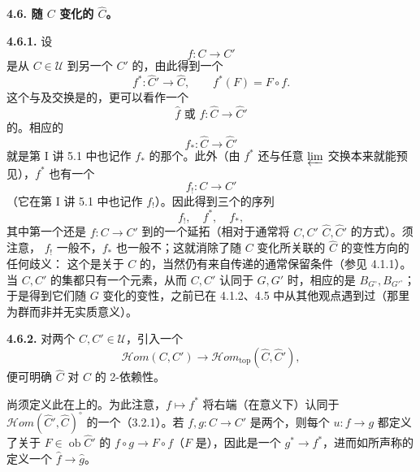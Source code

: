 \textbf{4.6. 随 $C$ 变化的 $\widehat C$。}

\textbf{4.6.1.} 设
\[
 f:C\longrightarrow C'
\]
是从 $C\in\mathcal U$ 到另一个 $C'$ 的，由此得到一个
\[
 f^*:\widehat C'\longrightarrow\widehat C,\qquad f^*(F)=F\circ f.
\]
这个与及交换是的，更可以看作一个
\[
 \widehat f\text{ 或 }f:\widehat C\longrightarrow\widehat C'
\]
的。相应的
\[
 f_*:\widehat C\longrightarrow\widehat C'
\]
就是第 I 讲 5.1 中也记作 $f_*$ 的那个。此外（由 $f^*$ 还与任意 $\varprojlim$ 交换本来就能预见），$f^*$ 也有一个
\[
 f_!:C\longrightarrow C'
\]
（它在第 I 讲 5.1 中也记作 $f_!$）。因此得到三个的序列
\[
 f_!,\quad f^*,\quad f_*,
\]
其中第一个还是 $f:C\to C'$ 到的一个延拓（相对于通常将 $C,C'$  $\widehat C,\widehat C'$ 的方式）。须注意， $f_!$ 一般不，$f_*$ 也一般不；这就消除了随 $C$ 变化所关联的 $\widehat C$ 的变性方向的任何歧义：
这个是关于 $C$ 的，当然仍有来自传递的通常保留条件（参见 4.1.1）。当 $C,C'$ 的集都只有一个元素，从而 $C,C'$ 认同于 $G,G'$ 时，相应的是 $B_{G^\circ},B_{G'^\circ}$；于是得到它们随 $G$ 变化的变性，之前已在 4.1.2、4.5 中从其他观点遇到过（那里为群而非并无实质意义）。

\textbf{4.6.2.} 对两个 $C,C'\in\mathcal U$，引入一个
\[
 \mathscr Hom(C,C')\longrightarrow\mathscr Hom_{\mathrm{top}}(\widehat C,\widehat C'),\tag{4.6.2.1}
\]
便可明确 $\widehat C$ 对 $C$ 的 2-依赖性。

尚须定义此在上的。为此注意，$f\mapsto f^*$ 将右端（在意义下）认同于 $\mathscr Hom(\widehat C',\widehat C)^\circ$ 的一个（3.2.1）。若 $f,g:C\to C'$ 是两个，则每个 $u:f\to g$ 都定义了关于 $F\in\operatorname{ob}\widehat C'$ 的 $f\circ g\to F\circ f$（$F$ 是），因此是一个 $g^*\to f^*$，进而如所声称的定义一个 $\widehat f\to\widehat g$。

